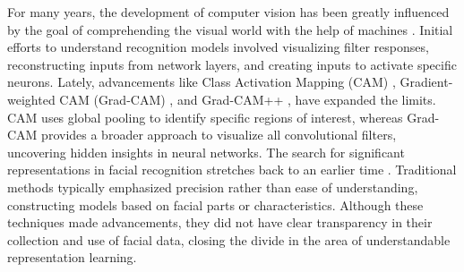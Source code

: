 For many years, the development of computer vision has been greatly influenced by the goal of comprehending the visual world with the help of machines \cite{juneja2013blocks, mahendran2016visualizing, parikh2011human, singh2012unsupervised, sudderth2005learning}. Initial efforts to understand recognition models involved visualizing filter responses, reconstructing inputs from network layers, and creating inputs to activate specific neurons. Lately, advancements like Class Activation Mapping (CAM) \cite{zhou2016learning}, Gradient-weighted CAM (Grad-CAM) \cite{selvaraju2017grad}, and Grad-CAM++ \cite{chattopadhay2018grad}, have expanded the limits. CAM uses global pooling to identify specific regions of interest, whereas Grad-CAM provides a broader approach to visualize all convolutional filters, uncovering hidden insights in neural networks. The search for significant representations in facial recognition stretches back to an earlier time \cite{chen2002principle, learned2016labeled, o2018face}. Traditional methods typically emphasized precision rather than ease of understanding, constructing models based on facial parts or characteristics. Although these techniques made advancements, they did not have clear transparency in their collection and use of facial data, closing the divide in the area of understandable representation learning.

